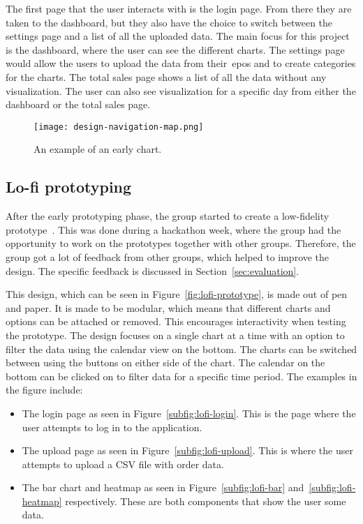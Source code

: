 The first page that the user interacts with is the login page.
From there they are taken to the dashboard, but they also have the choice to switch between the settings page and a list
of all the uploaded data.
The main focus for this project is the dashboard, where the user can see the different charts.
The settings page would allow the users to upload the data from their~\acrshort{epos} and to create categories for the
charts.
The total sales page shows a list of all the data without any visualization.
The user can also see visualization for a specific day from either the dashboard or the total sales page.

\begin{figure}[H]
    \centering
    \texttt{[image: design-navigation-map.png]}
    \caption{An example of an early chart.
    }\label{fig:navigation-map}
\end{figure}

\subsection{Lo-fi prototyping}\label{subsec:lo-fi-prototyping}

After the early prototyping phase, the group started to create a low-fidelity prototype~\cite{hi-lo-fidelity}.
This was done during a hackathon week, where the group had the opportunity to work on the prototypes together with
other groups.
Therefore, the group got a lot of feedback from other groups, which helped to improve the design.
The specific feedback is discussed in Section~\ref{sec:evaluation}.

This design, which can be seen in Figure~\ref{fig:lofi-prototype}, is made out of pen and paper.
It is made to be modular, which means that different charts and options can be attached or removed.
This encourages interactivity when testing the prototype.
The design focuses on a single chart at a time with an option to filter
the data using the calendar view on the bottom.
The charts can be switched between using the buttons on either side of the chart.
The calendar on the bottom can be clicked on to filter data for a specific time period.
The examples in the figure include:

\begin{itemize}
    \item The login page as seen in Figure~\ref{subfig:lofi-login}.
    This is the page where the user attempts to log in to the application.
    \item The upload page as seen in Figure~\ref{subfig:lofi-upload}.
    This is where the user attempts to upload a CSV file with order data.
    \item The bar chart and heatmap as seen in Figure~\ref{subfig:lofi-bar} and~\ref{subfig:lofi-heatmap} respectively.
    These are both components that show the user some data.
\end{itemize}

